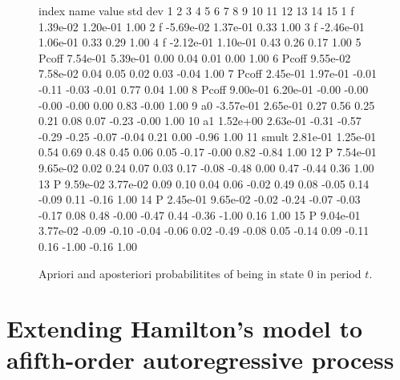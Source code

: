 \documentclass{admbmanual}
\begin{document}
\begin{figure}[h]
\centering
\begin{smallcode}
 index name  value    std dev    1     2     3     4     5     6     7     8     9    10    11    12    13    14   15   
   1  f      1.39e-02 1.20e-01  1.00
   2  f     -5.69e-02 1.37e-01  0.33  1.00
   3  f     -2.46e-01 1.06e-01  0.33  0.29  1.00
   4  f     -2.12e-01 1.10e-01  0.43  0.26  0.17  1.00
   5  Pcoff  7.54e-01 5.39e-01  0.00  0.04  0.01  0.00  1.00
   6  Pcoff  9.55e-02 7.58e-02  0.04  0.05  0.02  0.03 -0.04  1.00
   7  Pcoff  2.45e-01 1.97e-01 -0.01 -0.11 -0.03 -0.01  0.77  0.04  1.00
   8  Pcoff  9.00e-01 6.20e-01 -0.00 -0.00 -0.00 -0.00  0.00  0.83 -0.00  1.00
   9  a0    -3.57e-01 2.65e-01  0.27  0.56  0.25  0.21  0.08  0.07 -0.23 -0.00  1.00
  10  a1     1.52e+00 2.63e-01 -0.31 -0.57 -0.29 -0.25 -0.07 -0.04  0.21  0.00 -0.96  1.00
  11  smult  2.81e-01 1.25e-01  0.54  0.69  0.48  0.45  0.06  0.05 -0.17 -0.00  0.82 -0.84  1.00
  12  P      7.54e-01 9.65e-02  0.02  0.24  0.07  0.03  0.17 -0.08 -0.48  0.00  0.47 -0.44  0.36  1.00
  13  P      9.59e-02 3.77e-02  0.09  0.10  0.04  0.06 -0.02  0.49  0.08 -0.05  0.14 -0.09  0.11 -0.16  1.00
  14  P      2.45e-01 9.65e-02 -0.02 -0.24 -0.07 -0.03 -0.17  0.08  0.48 -0.00 -0.47  0.44 -0.36 -1.00  0.16  1.00
  15  P      9.04e-01 3.77e-02 -0.09 -0.10 -0.04 -0.06  0.02 -0.49 -0.08  0.05 -0.14  0.09 -0.11  0.16 -1.00 -0.16 1.00
\end{smallcode}
\caption{Apriori and aposteriori probabilitites of being in state 0 in period $t$.}
\label{fig:08}
\end{figure}


\section{Extending Hamilton's model to a\br fifth-order autoregressive process} 
\end{document}
